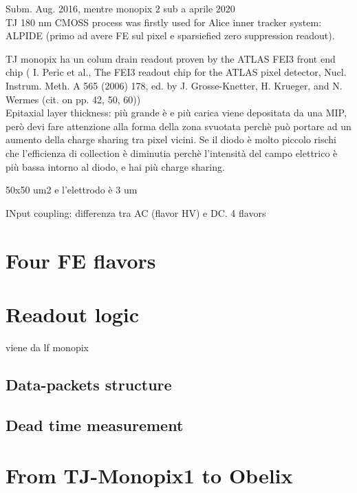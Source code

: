 
Subm. Aug. 2016, mentre monopix 2 sub a aprile 2020\\
TJ 180 nm CMOSS process was firstly used for Alice inner tracker system: ALPIDE
(primo ad avere FE sul pixel e sparsiefied zero suppression readout).

TJ monopix ha un colum drain readout proven by the ATLAS FEI3 front end chip (
I. Peric et al., The FEI3 readout chip for the ATLAS pixel detector,
Nucl. Instrum. Meth. A 565 (2006) 178, ed. by J. Grosse-Knetter, H. Krueger, and N. Wermes
(cit. on pp. 42, 50, 60))\\

Epitaxial layer thickness: più grande è e più carica viene depositata da una MIP,
però devi fare attenzione alla forma della zona svuotata perchè può portare ad un
aumento della charge sharing tra pixel vicini.
Se il diodo è molto piccolo rischi che l'efficienza di collection è diminutia perchè
l'intensità del campo elettrico è più bassa intorno al diodo, e hai più charge sharing.

50x50 um2 e l'elettrodo è 3 um

INput coupling: differenza tra AC (flavor HV) e DC. 4 flavors\\



\section{Four FE flavors}

\begin{comment}
    R resistenza di reset deve essere abbastanza grande in modo da far si che il
ritorno allo zero è abbastanza lento (non devi "interferire" con la tot slope
e non devi più corto del tempo del preamplificatore, sennò hai perdita di segnale).\\
Baseline reset: all'input solitamente hai un PMOSS o un diodo;  
Voltage amplifier: perchè? ripeti un attimo il vantaggio. \\
Source follower per disaccoppiare shaper e LF feedback.\\
\end{comment}


\section{Readout logic}
viene da lf monopix\\

\subsection{Data-packets structure}

\subsection{Dead time measurement}

\section{From TJ-Monopix1 to Obelix}
